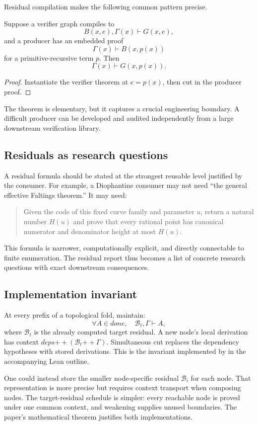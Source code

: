 Residual compilation makes the following common pattern precise.

\begin{theorem}\label{thm:producer-verifier}
Suppose a verifier graph compiles to
\[
 B(x,e),\Gamma(x)\vdash G(x,e),
\]
and a producer has an embedded proof
\[
 \Gamma(x)\vdash B(x,p(x))
\]
for a primitive-recursive term \(p\).  Then
\[
 \Gamma(x)\vdash G(x,p(x)).
\]
\end{theorem}

\begin{proof}
Instantiate the verifier theorem at \(e=p(x)\), then cut in the producer proof.
\end{proof}

The theorem is elementary, but it captures a crucial engineering boundary.  A difficult producer can be developed and audited independently from a large downstream verification library.

\subsection{Residuals as research questions}

A residual formula should be stated at the strongest reusable level justified by the consumer.  For example, a Diophantine consumer may not need ``the general effective Faltings theorem.''  It may need:
\begin{quote}
Given the code of this fixed curve family and parameter \(u\), return a natural number \(H(u)\) and prove that every rational point has canonical numerator and denominator height at most \(H(u)\).
\end{quote}
This formula is narrower, computationally explicit, and directly connectable to finite enumeration.  The residual report thus becomes a list of concrete research questions with exact downstream consequences.

\subsection{Implementation invariant}

At every prefix of a topological fold, maintain:
\[
 \forall A\in\textit{done},\quad \mathcal B_t,\Gamma\vdash A,
\]
where \(\mathcal B_t\) is the already computed target residual.  A new node's local derivation has context \(\textit{deps}\mathbin{++}(\mathcal B_t\mathbin{++}\Gamma)\).  Simultaneous cut replaces the dependency hypotheses with stored derivations.  This is the invariant implemented by  in the accompanying Lean outline.

One could instead store the smaller node-specific residual \(\mathcal B_i\) for each node.  That representation is more precise but requires context transport when composing nodes.  The target-residual schedule is simpler: every reachable node is proved under one common context, and weakening supplies unused boundaries.  The paper's mathematical theorem justifies both implementations.

